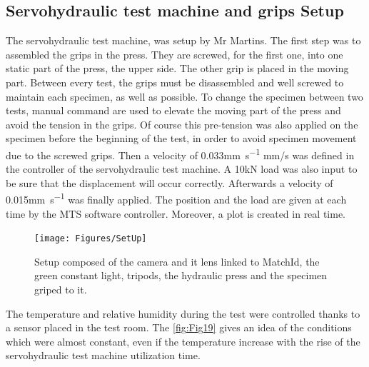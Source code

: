 \subsection{Servohydraulic test machine and grips Setup}

The servohydraulic test machine, was setup by Mr Martins. The first step was to assembled the grips in the press. They are screwed, for the first one, into one static part of the press, the upper side. The other grip is placed in the moving part. Between every test, the grips must be disassembled and well screwed to maintain each specimen, as well as possible. To change the specimen between two tests, manual command are used to elevate the moving part of the press and avoid the tension in the grips. Of course this pre-tension was also applied on the specimen before the beginning of the test, in order to avoid specimen movement due to the screwed grips.
Then a velocity of 0.033\si{\milli\meter\per\second} mm/s was defined in the controller of the servohydraulic test machine. A 10\si{\kilo\newton} load was also input to be sure that the displacement will occur correctly. Afterwards a velocity of 0.015\si{\milli\meter\per\second} was finally applied. The position and the load are given at each time by the MTS software controller. Moreover, a plot is created in real time.

\begin{figure}[t]
	\centering
	\texttt{[image: Figures/SetUp]}
	\decoRule
	\caption[Final setup]{Setup composed of the camera and it lens linked to MatchId, the green constant light, tripods, the hydraulic press and the specimen griped to it.}
	\label{fig:Fig18}
\end{figure}

The temperature and relative humidity during the test were controlled thanks to a sensor placed in the test room. The \ref{fig:Fig19} gives an idea of the conditions which were almost constant, even if the temperature increase with the rise of the servohydraulic test machine utilization time.

